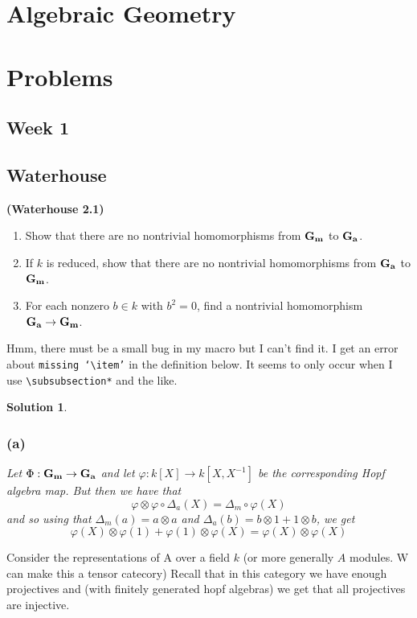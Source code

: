\documentclass[12pt]{article}
\theoremstyle{nonumberbreak}
\newtheorem{sol}{Solution}
\theoremstyle{changebreak}
\theoremstyle{nonumberplain}
\theoremstyle{change}
\newenvironment{wprob}[1]{\begin{prob}{\normalfont\bfseries (Waterhouse #1) }\itshape}{\end{prob}}
\DeclareMathOperator{\Ga}{\ensuremath\mathbf{G_a}}
\DeclareMathOperator{\Gm}{\ensuremath\mathbf{G_m}}
\begin{document}
\section{Algebraic Geometry}

\section{Problems}
\subsection{Week 1}

\subsection{Waterhouse}
\begin{wprob}{2.1}
	\begin{enumerate}
		\item Show that there are no nontrivial homomorphisms from $\Gm$ to $\Ga$.
		\item If $k$ is reduced, show that there are no nontrivial homomorphisms from $\Ga$ to $\Gm$.
		\item For each nonzero $b\in k$ with $b^2=0$, find a nontrivial homomorphism $\Ga\to\Gm$.
	\end{enumerate}
\end{wprob}
Hmm, there must be a small bug in my macro but I can't find it. I get an error about \texttt{missing `\textbackslash item'}
in the definition below. It seems to only occur when I use \texttt{\textbackslash subsubsection*} and the like.

\begin{sol}
	\subsubsection*{(a)}
	Let $\Phi:\Gm\to\Ga$ and let $\varphi:k[X]\to k[X,X^{-1}]$ be the corresponding Hopf
	algebra map. But then we have that 
	\[\varphi\otimes\varphi \circ \Delta_a(X)=\Delta_m\circ\varphi(X)\]
	and so using that $\Delta_m(a)=a\otimes a$ and $\Delta_a(b)=b\otimes1+1\otimes b$, we get
	\[\varphi(X)\otimes\varphi(1)+\varphi(1)\otimes\varphi(X)=\varphi(X)\otimes\varphi(X)\]
	
\end{sol}

Consider the representations of A over a field $k$ (or more generally $A$ modules. W can make this a tensor catecory)
Recall that in this category we have enough projectives and (with finitely generated hopf algebras) we get that all projectives are injective.
\end{document}
